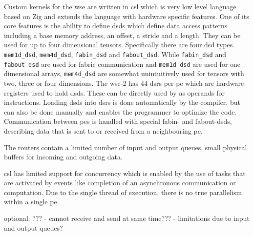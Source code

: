 Custom kernels for the \ac{wse} are written in \ac{csl} which is very low level language based on Zig and extends the language with hardware specific features.
One of its core features is the ability to define \acp{dsd} which define data access patterns including a base memory address, an offset, a stride and a length. They can be used for up to four dimensional tensors. Specifically there are four \ac{dsd} types. \texttt{mem1d_dsd}, \texttt{mem4d_dsd}, \texttt{fabin_dsd} and \texttt{fabout_dsd}. While \texttt{fabin_dsd} and \texttt{fabout_dsd} are used for fabric communication and \texttt{mem1d_dsd} are used for one dimensional arrays, \texttt{mem4d_dsd} are somewhat unintuitively used for tensors with two, three or four dimensions. The \ac{wse}-2 has 44 \acp{dsr} per \ac{pe} which are hardware registers used to hold \acp{dsd}. These can be directly used by as operands for instructions. Loading \acp{dsd} into \acp{dsr} is done automatically by the compiler, but can also be done manually and enables the programmer to optimize the code. Communication between \acp{pe} is handled with special fabin- and fabout-\acp{dsd}, describing data that is sent to or received from a neighbouring \ac{pe}.

The routers contain a limited number of input and output queues, small physical buffers for incoming and outgoing data.

\ac{csl} has limited support for concurrency which is enabled by the use of tasks that are activated by events like completion of an asynchronous communication or computation. Due to the single thread of execution, there is no true parallelism within a single \ac{pe}.

optional: ???
- cannot receive and send at same time???
- limitations due to input and output queues? 

